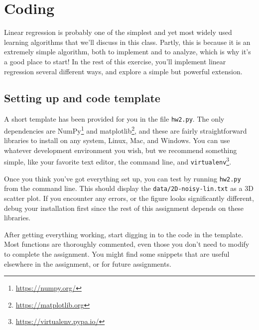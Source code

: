 \documentclass{article} %
\begin{document}
\section*{Coding}
Linear regression is probably one of the simplest and yet most widely used learning algorithms that we'll discuss in this 
class. Partly, this is because it is an extremely simple algorithm, both to implement and to analyze, which is why it's a 
good place to start! In the rest of this exercise, you'll implement linear regression several different ways, and explore a 
simple but powerful extension.

\subsection*{Setting up and code template}
A short template has been provided for you in the file \texttt{hw2.py}. The only dependencies are 
NumPy\footnote{\url{https://numpy.org/}} and matplotlib\footnote{\url{https://matplotlib.org}}, and these are fairly 
straightforward libraries to install on any system, Linux, Mac, and Windows. You can use whatever development environment you 
wish, but we recommend something simple, like your favorite text editor, the command line, and 
\texttt{virtualenv}\footnote{\url{https://virtualenv.pypa.io/}}.

Once you think you've got everything set up, you can test by running \texttt{hw2.py} from the command line. This should 
display the \texttt{data/2D-noisy-lin.txt} as a 3D scatter plot. If you 
encounter any errors, or the figure looks significantly different, debug your installation first since the rest of this 
assignment depends on these libraries.

After getting everything working, start digging in to the code in the template. Most functions are thoroughly commented, even 
those you don't need to modify to complete the assignment. You might find some snippets that are useful elsewhere in the assignment, or for future assignments.
\end{document}
